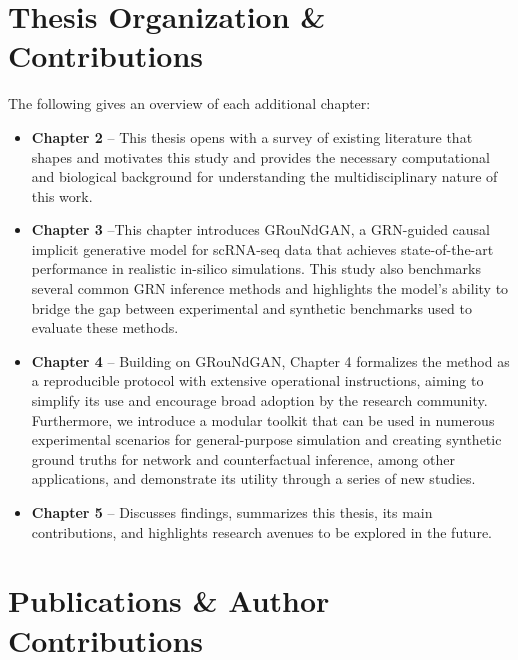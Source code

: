 \section*{Thesis Organization \& Contributions}

The following gives an overview of each additional chapter:

\begin{itemize}
    \item \textbf{\sffamily Chapter 2} -- This thesis opens with a survey of existing literature that shapes and motivates this study and provides the necessary computational and biological background for understanding the multidisciplinary nature of this work.
    \item \textbf{\sffamily Chapter 3} --This chapter introduces GRouNdGAN, a GRN-guided causal implicit generative model for  scRNA-seq data that achieves state-of-the-art performance in realistic in-silico simulations. This study also benchmarks several common GRN inference methods and highlights the model’s ability to bridge the gap between experimental and synthetic benchmarks used to evaluate these methods. 
    \item \textbf{\sffamily Chapter 4} -- Building on GRouNdGAN, Chapter 4 formalizes the method as a reproducible protocol with extensive operational instructions, aiming to simplify its use and encourage broad adoption by the research community. Furthermore, we introduce a modular toolkit that can be used in numerous experimental scenarios for general-purpose simulation and creating synthetic ground truths for network and counterfactual inference, among other applications, and demonstrate its utility through a series of new studies.
    \item \textbf{\sffamily Chapter 5} -- Discusses findings, summarizes this thesis, its main contributions, and highlights research avenues to be explored in the future. 
\end{itemize}


\newpage


\section*{Publications \& Author Contributions}

